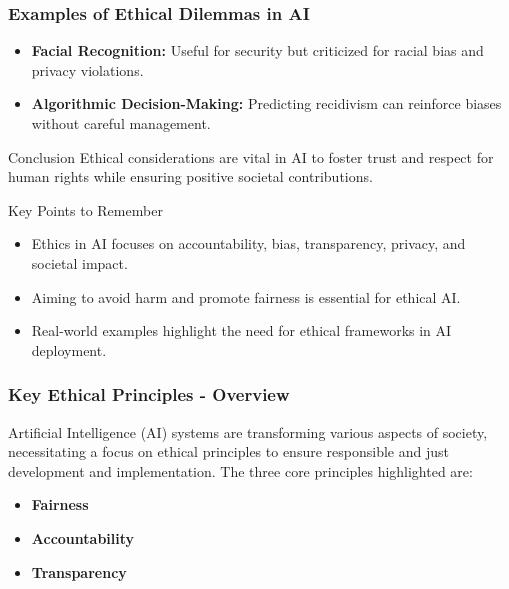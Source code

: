 \documentclass[aspectratio=169]{beamer}
\begin{document}
\begin{frame}[fragile]
  \frametitle{Examples of Ethical Dilemmas in AI}
  \begin{itemize}
    \item \textbf{Facial Recognition:} Useful for security but criticized for racial bias and privacy violations.
    \item \textbf{Algorithmic Decision-Making:} Predicting recidivism can reinforce biases without careful management.
  \end{itemize}
  
  \begin{block}{Conclusion}
    Ethical considerations are vital in AI to foster trust and respect for human rights while ensuring positive societal contributions. 
  \end{block}
  
  \begin{block}{Key Points to Remember}
    \begin{itemize}
      \item Ethics in AI focuses on accountability, bias, transparency, privacy, and societal impact.
      \item Aiming to avoid harm and promote fairness is essential for ethical AI.
      \item Real-world examples highlight the need for ethical frameworks in AI deployment.
    \end{itemize}
  \end{block}
\end{frame}

\begin{frame}[fragile]
  \frametitle{Key Ethical Principles - Overview}
  Artificial Intelligence (AI) systems are transforming various aspects of society, necessitating a focus on ethical principles to ensure responsible and just development and implementation. The three core principles highlighted are:
  \begin{itemize}
    \item \textbf{Fairness}
    \item \textbf{Accountability}
    \item \textbf{Transparency}
  \end{itemize}
\end{frame}
\end{document}
